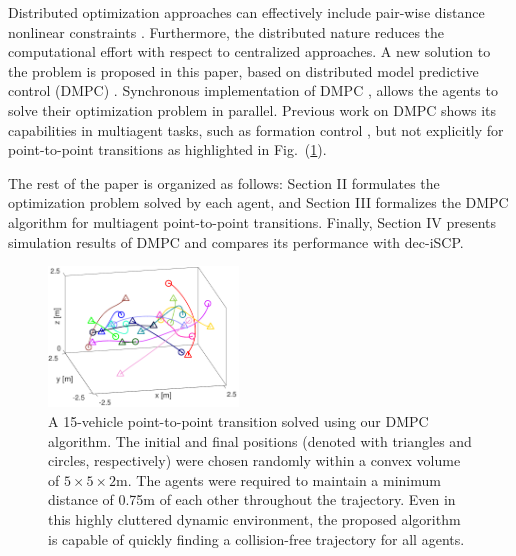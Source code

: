 Distributed optimization approaches can effectively include pair-wise distance nonlinear constraints \cite{bhattacharya2011distributed}. Furthermore, the distributed nature reduces the computational effort with respect to centralized approaches. A new solution to the problem is proposed in this paper, based on distributed model predictive control (DMPC) \cite{camponogara2002distributed}. Synchronous implementation of DMPC \cite{dai2017distributed,wang2014synthesis}, allows the agents to solve their optimization problem in parallel. Previous work on DMPC shows its capabilities in multiagent tasks, such as formation control \cite{van2017distributed,sayyaadi2017decentralized}, but not explicitly for point-to-point transitions as highlighted in Fig.~(\ref{fig:30_random}).

The rest of the paper is organized as follows: Section II formulates the optimization problem solved by each agent, and Section III formalizes the DMPC algorithm for multiagent point-to-point transitions. Finally, Section IV presents simulation results of DMPC and compares its performance with dec-iSCP.

\begin{figure}[t]
	\centering
	\includegraphics[width=0.45\textwidth]{figures/30_rand}
	\caption{A 15-vehicle point-to-point transition solved using our DMPC algorithm. The initial and final positions (denoted with triangles and circles, respectively) were chosen randomly within a convex volume of $5 \times 5 \times 2$m. The agents were required to maintain a minimum distance of 0.75m of each other throughout the trajectory. Even in this highly cluttered dynamic environment, the proposed algorithm is capable of quickly finding a collision-free trajectory for all agents.}
	\label{fig:30_random}
\end{figure}






